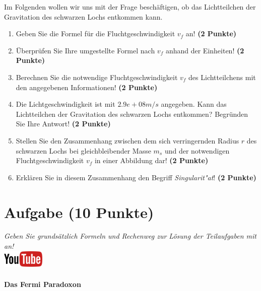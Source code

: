 \documentclass[a4paper, 10pt]{scrartcl}\usepackage[]{graphicx}\usepackage[]{xcolor}
\begin{document}
Im Folgenden wollen wir uns mit der Frage besch{\"a}ftigen, ob das
Lichtteilchen der Gravitation des schwarzen Lochs entkommen kann.

\begin{enumerate}
\item Geben Sie die Formel f{\"u}r die Fluchtgeschwindigkeit $v_f$ an! 
  \textbf{(2 Punkte)}
\item {\"U}berpr{\"u}fen Sie Ihre umgestellte Formel nach $v_f$ anhand der Einheiten!
  \textbf{(2 Punkte)} 
\item Berechnen Sie die notwendige Fluchtgeschwindigkeit $v_f$ des
  Lichtteilchens mit den angegebenen Informationen! \textbf{(2 Punkte)}
\item Die Lichtgeschwindigkeit ist mit $2.9e+08m/s$ angegeben. Kann das
  Lichtteilchen der Gravitation des schwarzen Lochs entkommen? Begr{\"u}nden
  Sie Ihre Antwort! \textbf{(2 Punkte)}
\item Stellen Sie den Zusammenhang zwischen dem sich verringernden Radius
  $r$ des schwarzen Lochs bei gleichbleibender Masse $m_s$
  und der notwendigen Fluchtgeschwindigkeit $v_f$ in einer Abbildung dar!
  \textbf{(2 Punkte)}
\item Erkl{\"a}ren Sie in diesem Zusammenhang den Begriff
  \textit{Singularit{"a}t}! \textbf{(2 Punkte)} 
\end{enumerate}


 
\clearpage

\section{Aufgabe \hfill (10 Punkte)}

\textit{Geben Sie grunds{\"a}tzlich Formeln und Rechenweg zur L{\"o}sung der
  Teilaufgaben mit an!} \\[1Ex]

\hfill\href{https://youtu.be/-b4IRu2-EJo}{\includegraphics[width =
  2cm]{img/youtube}} %
\hspace{2Ex}

\paragraph{Das Fermi Paradoxon}
\end{document}
